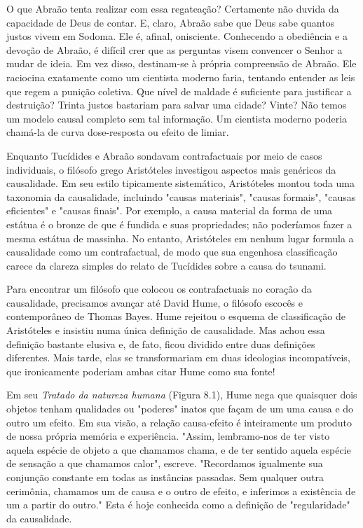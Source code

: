 \documentclass[11pt,a5paper,twoside]{book}
\begin{document}
O que Abraão tenta realizar com essa regateação? Certamente não duvida da capacidade de Deus de contar. E, claro, Abraão sabe que Deus sabe quantos justos vivem em Sodoma. Ele é, afinal, onisciente. Conhecendo a obediência e a devoção de Abraão, é difícil crer que as perguntas visem convencer o Senhor a mudar de ideia. Em vez disso, destinam-se à própria compreensão de Abraão. Ele raciocina exatamente como um cientista moderno faria, tentando entender as leis que regem a punição coletiva. Que nível de maldade é suficiente para justificar a destruição? Trinta justos bastariam para salvar uma cidade? Vinte? Não temos um modelo causal completo sem tal informação. Um cientista moderno poderia chamá-la de curva dose-resposta ou efeito de limiar.

Enquanto Tucídides e Abraão sondavam contrafactuais por meio de casos individuais, o filósofo grego Aristóteles investigou aspectos mais genéricos da causalidade. Em seu estilo tipicamente sistemático, Aristóteles montou toda uma taxonomia da causalidade, incluindo "causas materiais", "causas formais", "causas eficientes" e "causas finais". Por exemplo, a causa material da forma de uma estátua é o bronze de que é fundida e suas propriedades; não poderíamos fazer a mesma estátua de massinha. No entanto, Aristóteles em nenhum lugar formula a causalidade como um contrafactual, de modo que sua engenhosa classificação carece da clareza simples do relato de Tucídides sobre a causa do tsunami.

Para encontrar um filósofo que colocou os contrafactuais no coração da causalidade, precisamos avançar até David Hume, o filósofo escocês e contemporâneo de Thomas Bayes. Hume rejeitou o esquema de classificação de Aristóteles e insistiu numa única definição de causalidade. Mas achou essa definição bastante elusiva e, de fato, ficou dividido entre duas definições diferentes. Mais tarde, elas se transformariam em duas ideologias incompatíveis, que ironicamente poderiam ambas citar Hume como sua fonte!

Em seu \textit{Tratado da natureza humana} (Figura 8.1), Hume nega que quaisquer dois objetos tenham qualidades ou "poderes" inatos que façam de um uma causa e do outro um efeito. Em sua visão, a relação causa-efeito é inteiramente um produto de nossa própria memória e experiência. "Assim, lembramo-nos de ter visto aquela espécie de objeto a que chamamos chama, e de ter sentido aquela espécie de sensação a que chamamos calor", escreve. "Recordamos igualmente sua conjunção constante em todas as instâncias passadas. Sem qualquer outra cerimônia, chamamos um de causa e o outro de efeito, e inferimos a existência de um a partir do outro." Esta é hoje conhecida como a definição de "regularidade" da causalidade.
\end{document}
